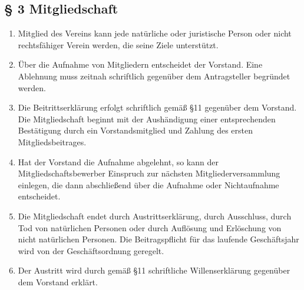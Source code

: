 ﻿\documentclass[10pt,a4paper]{scrartcl}
\begin{document}
\subsection*{§ 3 Mitgliedschaft}
\begin{enumerate}
        \item Mitglied des Vereins kann jede natürliche oder juristische Person oder
                nicht rechts\-fähiger Verein werden, die seine Ziele unterstützt.
        \item Über die Aufnahme von Mitgliedern entscheidet der Vorstand. Eine Ablehnung muss zeitnah schriftlich gegenüber dem Antragsteller begründet werden.
        \item Die Beitrittserklärung erfolgt schriftlich gemäß §11 gegenüber dem Vorstand. Die
                Mitgliedschaft beginnt mit der Aushändigung einer entsprechenden Bestätigung durch
                ein Vorstandsmitglied und Zahlung des ersten Mitgliedsbeitrages.
        \item Hat der Vorstand die Aufnahme abgelehnt, so kann der Mitgliedschaftsbewerber Einspruch
                zur nächsten Mitgliederversammlung einlegen, die dann abschließend über die Aufnahme
                oder Nichtaufnahme entscheidet.
        \item Die Mitgliedschaft endet durch Austrittserklärung, durch Ausschluss, durch Tod von
                natür\-li\-chen Personen oder durch Auflösung und Erlöschung von nicht
                natür\-lichen Personen.
                Die Beitragspflicht für das laufende Geschäftsjahr wird von der Geschäftsordnung
                geregelt.
        \item Der Austritt wird durch gemäß §11 schriftliche Willenserklärung gegenüber dem Vorstand
                erklärt.
\end{enumerate}
%
%
\end{document}
